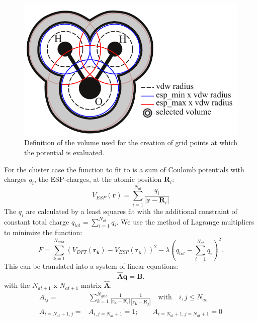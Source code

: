 \begin{figure}[h]
\begin{center}
\includegraphics[height=9 cm]{esp_radius}
\end{center}
\caption{Definition of the volume used for the creation of grid points at which the potential is evaluated.} 
\label{esp_radius}
\end{figure}
For the cluster case the function to fit to is a sum of Coulomb potentials with charges $q_i$, the ESP-charges, 
at the atomic position $\mathbf{R}_i$:
\begin{equation}
 V_{ESP}(\mathbf{r})=\sum_{i=1}^{N_{at}}\frac{q_i}{|\mathbf{r}-\mathbf{R}_i|}
\end{equation}
The $q_i$ are calculated by a least squares fit with the additional constraint of constant total charge $q_{tot}=\sum_{i=1}^{N_{at}} q_i$. 
We use the method of Lagrange multipliers to minimize the function:
\begin{equation}
 F=\sum_{k=1}^{N_{grid}}\left(V_{DFT}(\mathbf{r_k})-V_{ESP}(\mathbf{r_k})\right)^2-\lambda\left(q_{tot}-\sum_{i=1}^{N_{at}}q_i\right)^2.\label{F_esp}
\end{equation}
This can be translated into a system of linear equations:
\begin{equation}
 \mathbf{\hat{A}}\mathbf{q}=\mathbf{B}.
\end{equation}
with the $N_{at+1}$ x $N_{at+1}$ matrix $\mathbf{\hat{A}}$:
\begin{align}
A_{ij}=&\sum_{k=1}^{N_{grid}}\frac{1}{|\mathbf{r_k}-\mathbf{R}_i|}\frac{1}{|\mathbf{r_k}-\mathbf{R}_j|}\quad \mathrm{with}\quad i,j\leq N_{at}\\
A_{i=N_{at}+1,j}=&A_{i,j=N_{at}+1}=1;\qquad A_{i=N_{at}+1,j=N_{at}+1}=0\nonumber
\end{align}
